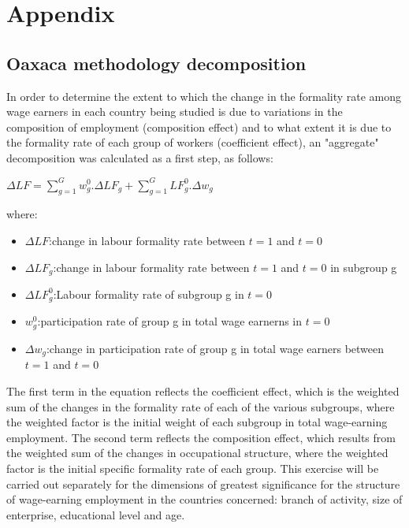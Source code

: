 \documentclass[english]{article}
\begin{document}
\section{Appendix}
\subsection{Oaxaca methodology decomposition}
In order to determine the extent to which the change in the formality rate among wage earners in each country being studied is due to variations in the composition of employment (composition effect) and to what extent it is due to the formality rate of each group of workers (coefficient effect), an "aggregate" decomposition was calculated as a first step, as follows:

${\Delta}LF=\sum_{g=1}^{G}w_g^{0}.{\Delta}LF_g+\sum_{g=1}^{G}LF_g^{0}.{\Delta}w_g$

where:
\begin{itemize}

\item ${\Delta}LF$:change in labour formality rate between $t=1$ and $t=0$ 
\item ${\Delta}LF_g$:change in labour formality rate between $t=1$ and $t=0$ in subgroup g
\item ${\Delta}LF_g^{0}$:Labour formality rate of subgroup g in $t=0$
\item $w_g^{0}$:participation rate of group g in total wage earnerns in $t=0$
\item ${\Delta}w_g$:change in participation rate of group g in total wage earners between $t=1$ and $t=0$ 
\end{itemize}

The first term in the equation reflects the coefficient effect, which is the weighted sum of the changes in the formality rate of each of the various subgroups, where the weighted factor is the initial weight of each subgroup in total wage-earning employment. The second term reflects the composition effect, which results from the weighted sum of the changes in occupational structure, where the weighted factor is the initial specific formality rate of each group.
This exercise will be carried out separately for the dimensions of greatest significance for the structure of wage-earning employment in the countries concerned: branch of activity, size of enterprise, educational level and age.
\end{document}
